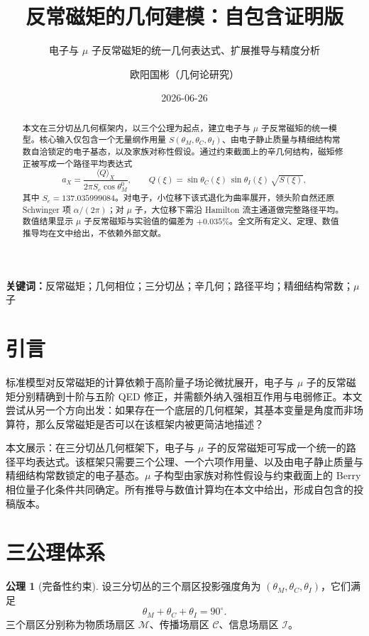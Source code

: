 \documentclass[12pt,a4paper]{article}
\title{反常磁矩的几何建模：自包含证明版}
\subtitle{电子与 $\mu$ 子反常磁矩的统一几何表达式、扩展推导与精度分析}
\author{欧阳国彬（几何论研究）}
\date{2026-06-26}
\theoremstyle{definition}
\newtheorem{axiom}{公理}
\begin{document}
\maketitle

\begin{abstract}
本文在三分切丛几何框架内，以三个公理为起点，建立电子与 $\mu$ 子反常磁矩的统一模型。核心输入仅包含一个无量纲作用量 $S(\theta_M,\theta_C,\theta_I)$、由电子静止质量与精细结构常数自洽锁定的电子基态，以及家族对称性假设。通过约束截面上的辛几何结构，磁矩修正被写成一个路径平均表达式
\begin{equation*}
a_X=\frac{\langle Q\rangle_X}{2\pi S_e\cos\theta_M^0},\qquad Q(\xi)=\sin\theta_C(\xi)\,\sin\theta_I(\xi)\,\sqrt{S(\xi)},
\end{equation*}
其中 $S_e=137.035999084$。对电子，小位移下该式退化为曲率展开，领头阶自然还原 Schwinger 项 $\alpha/(2\pi)$；对 $\mu$ 子，大位移下需沿 Hamilton 流主通道做完整路径平均。数值结果显示 $\mu$ 子反常磁矩与实验值的偏差为 $+0.035\%$。全文所有定义、定理、数值推导均在文中给出，不依赖外部文献。
\end{abstract}

\textbf{关键词：}反常磁矩；几何相位；三分切丛；辛几何；路径平均；精细结构常数；$\mu$ 子

\section{引言}

标准模型对反常磁矩的计算依赖于高阶量子场论微扰展开，电子与 $\mu$ 子的反常磁矩分别精确到十阶与五阶 QED 修正，并需额外纳入强相互作用与电弱修正。本文尝试从另一个方向出发：如果存在一个底层的几何框架，其基本变量是角度而非场算符，那么反常磁矩是否可以在该框架内被更简洁地描述？

本文展示：在三分切丛几何框架下，电子与 $\mu$ 子的反常磁矩可写成一个统一的路径平均表达式。该框架只需要三个公理、一个六项作用量、以及由电子静止质量与精细结构常数锁定的电子基态。$\mu$ 子构型由家族对称性假设与约束截面上的 Berry 相位量子化条件共同确定。所有推导与数值计算均在本文中给出，形成自包含的投稿版本。

\section{三公理体系}

\begin{axiom}[完备性约束]
设三分切丛的三个扇区投影强度角为 $(\theta_M,\theta_C,\theta_I)$，它们满足
\begin{equation}
\boxed{\theta_M+\theta_C+\theta_I=90^\circ.}
\end{equation}
三个扇区分别称为物质场扇区 $\mathcal{M}$、传播场扇区 $\mathcal{C}$、信息场扇区 $\mathcal{I}$。
\end{axiom}
\end{document}
